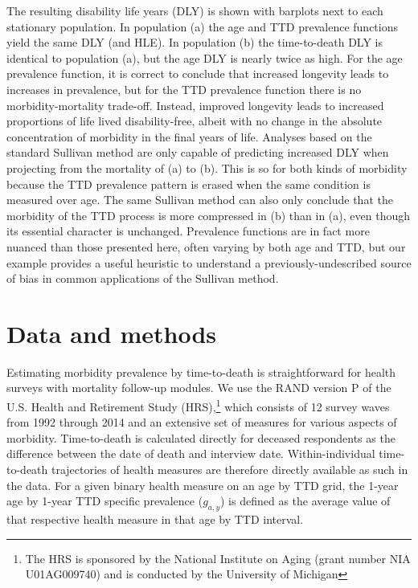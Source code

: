 \documentclass[11pt,oneside,a4paper]{article} %
\begin{document}
The resulting disability life years (DLY) is shown with
barplots next to each stationary population.
In population (a) the age and TTD prevalence functions yield
the same DLY (and HLE). In population (b) the time-to-death DLY is identical to
population (a), but the age DLY is nearly twice as high. For the
age prevalence function, it is correct to conclude that increased longevity leads to
increases in prevalence, but for the TTD prevalence function there is
no morbidity-mortality trade-off. Instead, improved longevity leads to increased proportions of life
lived disability-free, albeit with no change in the absolute concentration of morbidity in the final years of life. Analyses
based on the standard Sullivan method \citep{Sullivan1970} are only capable of
predicting increased DLY when projecting from the mortality of (a) to (b). This
is so for both kinds of morbidity because the TTD prevalence pattern
is erased when the same condition is measured over age. The same
Sullivan method can also only conclude that the morbidity of the TTD
process is more compressed in (b) than in (a), even though its essential
character is unchanged. Prevalence functions are in fact more nuanced than those
presented here, often varying by both age and TTD, but our example provides a useful heuristic to understand a previously-undescribed source of bias in common applications of the Sullivan method.

\section{Data and methods}
\label{sec:datamethods}
Estimating morbidity prevalence by time-to-death is straightforward for health surveys with mortality follow-up modules. We use the RAND version P of the U.S. Health and Retirement Study (HRS),\footnote{The HRS is sponsored by the National Institute on Aging (grant number NIA U01AG009740) and is conducted by the University of Michigan} which consists of 12 survey waves from 1992 through 2014 and an extensive set of measures for various aspects of morbidity. Time-to-death is calculated directly for deceased respondents as the difference between the date of death and interview date. Within-individual time-to-death trajectories of health measures are therefore directly available as such in the data. For a given binary health measure on an age by TTD grid, the 1-year age by 1-year TTD specific prevalence ($g_{a,y}$) is defined as the average value of that respective health measure in that age by TTD interval.
\end{document}
